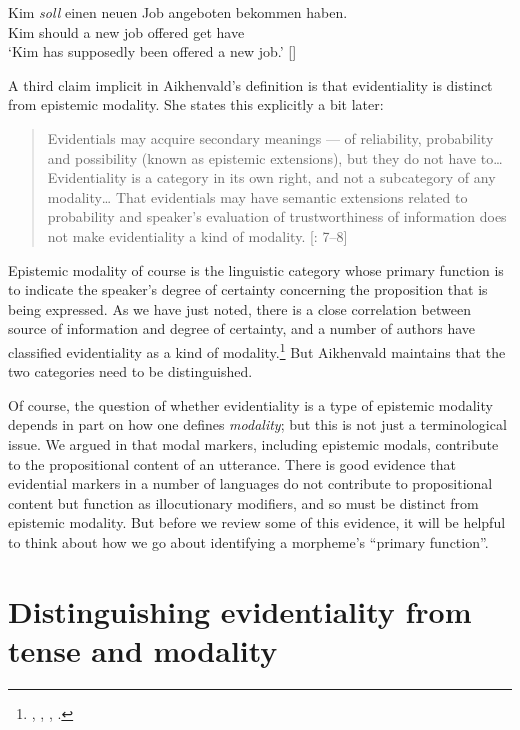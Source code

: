 \ea \label{ex:17.4}
\gll Kim  \textit{soll}  einen  neuen  Job  angeboten  bekommen  haben.\\
Kim  should a  new  job  offered  get  have\\
\glt ‘Kim has supposedly been offered a new job.’  [\citealt{vonFintel2006}]
\z


A third claim implicit in Aikhenvald’s definition is that evidentiality is distinct from epistemic modality. She states this explicitly a bit later:


\begin{quote}
Evidentials may acquire secondary meanings — of reliability, probability and possibility (known as epistemic extensions), but they do not have to… Evidentiality is a category in its own right, and not a subcategory of any modality… That evidentials may have semantic extensions related to probability and speaker’s evaluation of trustworthiness of information does not make evidentiality a kind of modality. [\citealt{Aikhenvald2004}: 7–8]
\end{quote}


Epistemic modality of course is the linguistic category whose primary function is to indicate the speaker’s degree of certainty concerning the proposition that is being expressed. As we have just noted, there is a close correlation between source of information and degree of certainty, and a number of authors have classified evidentiality as a kind of modality.\footnote{\citet{Palmer1986}, \citet{Frawley1992}, \citet{MatthewsonEtAl2007}, \citet{Izvorski1997}.} But Aikhenvald maintains that the two categories need to be distinguished. 



Of course, the question of whether evidentiality is a type of epistemic modality depends in part on how one defines \textit{modality}; but this is not just a terminological issue. We argued in  that modal markers, including epistemic modals, contribute to the propositional content of an utterance. There is good evidence that evidential markers in a number of languages do not contribute to propositional content but function as illocutionary modifiers, and so must be distinct from epistemic modality. But before we review some of this evidence, it will be helpful to think about how we go about identifying a morpheme’s “primary function”.


\section{Distinguishing evidentiality from tense and modality}\label{sec:17.4}

